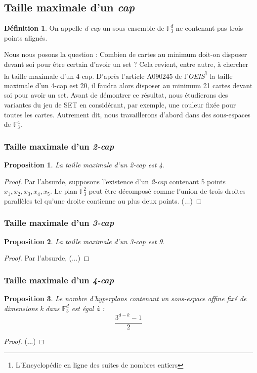 \documentclass[a4paper,12pt,titlepage]{article}
\theoremstyle{plain}
\newtheorem{prop}{Proposition}
\newcommand{\Ftrois}[1]{\mathbb{F}^#1_3}
\theoremstyle{definition}
\newtheorem{defi}{Définition}
\begin{document}
\subsection{Taille maximale d'un \emph{cap}}
\begin{defi}
On appelle \emph{d-cap} un sous ensemble de  $\Ftrois{d}$ ne contenant pas trois points alignés. \\
\end{defi}
Nous nous posons la question : Combien de cartes au minimum doit-on disposer devant soi pour être certain d'avoir un set ?
Cela revient, entre autre, à chercher la taille maximale d'un 4-cap. D'après l'article A090245 de l'\emph{OEIS}\footnote{L'Encyclopédie en ligne des suites de nombres entiers} la taille maximale d'un 4-cap est 20, il faudra alors disposer au minimum 21 cartes devant soi pour avoir un set.
Avant de démontrer ce résultat, nous étudierons des variantes du jeu de SET en considérant, par exemple, une couleur fixée pour toutes les cartes. Autrement dit, nous travaillerons d'abord dans des sous-espaces de  $\Ftrois{4}$.

\subsubsection{Taille maximale d'un \emph{2-cap}}
\begin{prop}
La taille maximale d'un \emph{2-cap} est 4.
\end{prop}
\begin{proof}
Par l'absurde, supposons l'existence d'un \emph{2-cap} contenant 5 points $x_1,x_2,x_3,x_4,x_5$.
Le plan  $\Ftrois{2}$ peut être décomposé comme l'union de trois droites parallèles tel qu'une droite contienne au plus deux points.  (...)
\end{proof}

\subsubsection{Taille maximale d'un \emph{3-cap}}
\begin{prop} \label{prop:3cap}
La taille maximale d'un \emph{3-cap} est 9.
\end{prop}
\begin{proof}
Par l'absurde, (...)
\end{proof}

\subsubsection{Taille maximale d'un \emph{4-cap}}
\begin{prop} \label{prop:nbhyp}
Le nombre d'hyperplans contenant un sous-espace affine fixé de dimensions k dans $\Ftrois{d}$ est égal à :
\[
\frac{3^{d-k}-1}{2}
\]
\end{prop}
\begin{proof}
(...)
\end{proof}
\end{document}
